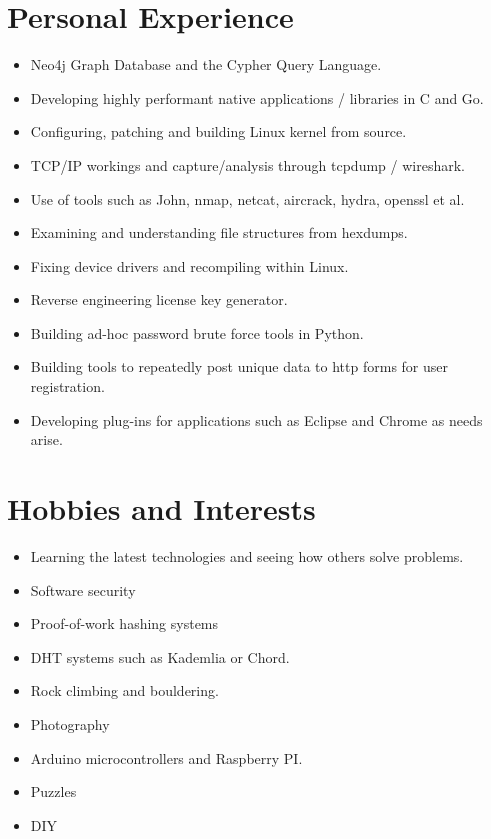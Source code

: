 \documentclass[a4paper,10pt]{moderncv}
\begin{document}
\section{Personal Experience}
\begin{itemize}
\item Neo4j Graph Database and the Cypher Query Language.
\item Developing highly performant native applications / libraries in C and Go.
\item Configuring, patching and building Linux kernel from source.
\item TCP/IP workings and capture/analysis through tcpdump / wireshark.
\item Use of tools such as John, nmap, netcat, aircrack, hydra, openssl et al.
\item Examining and understanding file structures from hexdumps.
\item Fixing device drivers and recompiling within Linux.
\item Reverse engineering license key generator.
\item Building ad-hoc password brute force tools in Python.
\item Building tools to repeatedly post unique data to http forms for user registration.
\item Developing plug-ins for applications such as Eclipse and Chrome as needs arise.
\end{itemize}

\section{Hobbies and Interests}
\begin{itemize}
\item Learning the latest technologies and seeing how others solve problems.
\item Software security
\item Proof-of-work hashing systems
\item DHT systems such as Kademlia or Chord.
\item Rock climbing and bouldering.
\item Photography
\item Arduino microcontrollers and Raspberry PI.
\item Puzzles
\item DIY
\end{itemize}
\end{document}
